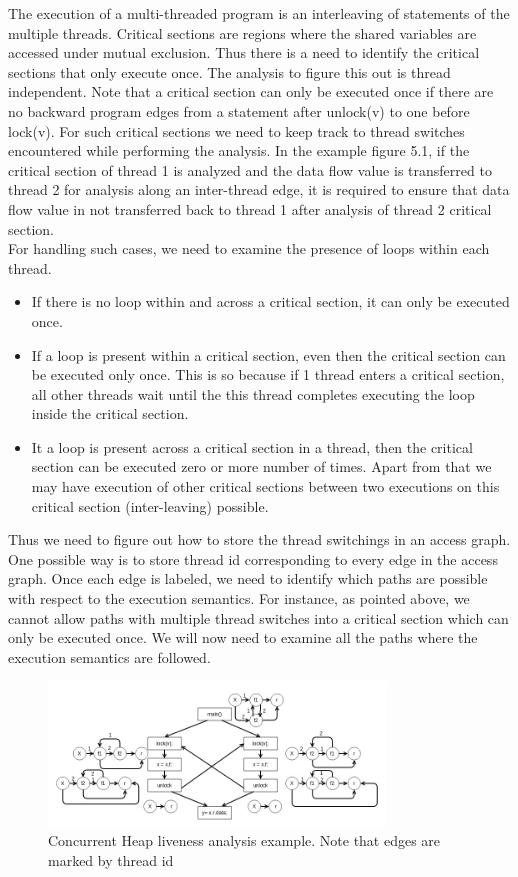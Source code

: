 The execution of a multi-threaded program is an interleaving of statements of the multiple threads. Critical sections are regions where the shared variables are accessed under mutual exclusion. Thus there is a need to identify the critical sections that only execute once. The analysis to figure this out is thread independent. Note that a critical section can only be executed once if there are no backward program edges from a statement after unlock(v) to one before lock(v). For such critical sections we need to keep track to thread switches encountered while performing the analysis. In the example figure 5.1, if the critical section of thread 1 is analyzed and the data flow value is transferred to thread 2 for analysis along an inter-thread edge, it is required to ensure that data flow value in not transferred back to thread 1 after analysis of thread 2 critical section. \\


For handling such cases, we need to examine the presence of loops within each thread. 
\begin{itemize}
	\item If there is no loop within and across a critical section, it can only be executed once.
	\item If a loop is present within a critical section, even then the critical section can be executed only once. This is so because if 1 thread enters a critical section, all other threads wait until the this thread completes executing the loop inside the critical section.
	\item It a loop is present across a critical section in a thread, then the critical section can be executed zero or more number of times. Apart from that we may have execution of other critical sections between two executions on this critical section (inter-leaving) possible.
\end{itemize} 

Thus we need to figure out how to store the thread switchings in an access graph. One possible way is to store thread id corresponding to every edge in the access graph. Once each edge is labeled, we need to identify which paths are possible with respect to the execution semantics. For instance, as pointed above, we cannot allow paths with multiple thread switches into a critical section which can only be executed once. We will now need to examine all the paths where the execution semantics are followed. \\

\begin{figure}
	\centering
	\includegraphics[width=0.8\textwidth]{Figures/conc_analysis_thr_itr3.jpg}
	\caption{Concurrent Heap liveness analysis example. Note that edges are marked by thread id}
	\label{fig:threadidanalysis}
\end{figure}

